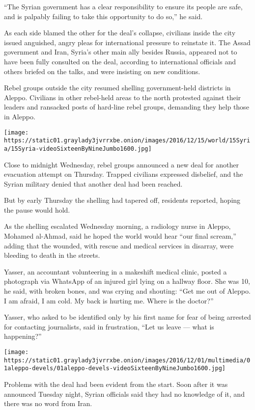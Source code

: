 ``The Syrian government has a clear responsibility to ensure its people
are safe, and is palpably failing to take this opportunity to do so,''
he said.

As each side blamed the other for the deal's collapse, civilians inside
the city issued anguished, angry pleas for international pressure to
reinstate it. The Assad government and Iran, Syria's other main ally
besides Russia, appeared not to have been fully consulted on the deal,
according to international officials and others briefed on the talks,
and were insisting on new conditions.

Rebel groups outside the city resumed shelling government-held districts
in Aleppo. Civilians in other rebel-held areas to the north protested
against their leaders and ransacked posts of hard-line rebel groups,
demanding they help those in Aleppo.

\texttt{[image: https://static01.graylady3jvrrxbe.onion/images/2016/12/15/world/15Syria/15Syria-videoSixteenByNineJumbo1600.jpg]}

Close to midnight Wednesday, rebel groups announced a new deal for
another evacuation attempt on Thursday. Trapped civilians expressed
disbelief, and the Syrian military denied that another deal had been
reached.

But by early Thursday the shelling had tapered off, residents reported,
hoping the pause would hold.

As the shelling escalated Wednesday morning, a radiology nurse in
Aleppo, Mohamed al-Ahmad, said he hoped the world would hear ``our final
scream,'' adding that the wounded, with rescue and medical services in
disarray, were bleeding to death in the streets.

Yasser, an accountant volunteering in a makeshift medical clinic, posted
a photograph via WhatsApp of an injured girl lying on a hallway floor.
She was 10, he said, with broken bones, and was crying and shouting:
``Get me out of Aleppo. I am afraid, I am cold. My back is hurting me.
Where is the doctor?''

Yasser, who asked to be identified only by his first name for fear of
being arrested for contacting journalists, said in frustration, ``Let us
leave --- what is happening?''

\texttt{[image: https://static01.graylady3jvrrxbe.onion/images/2016/12/01/multimedia/01aleppo-devels/01aleppo-devels-videoSixteenByNineJumbo1600.jpg]}

Problems with the deal had been evident from the start. Soon after it
was announced Tuesday night, Syrian officials said they had no knowledge
of it, and there was no word from Iran.


